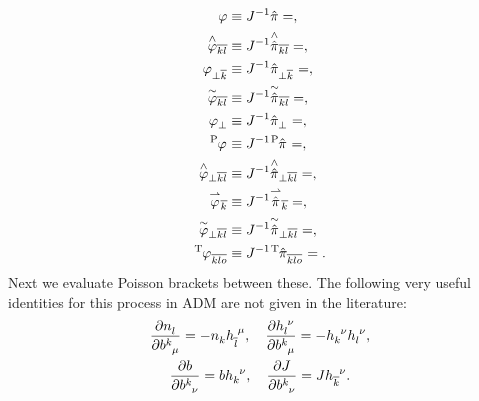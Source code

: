 \documentclass[aps,prd,reprint,preprintnumbers,superscriptaddress,showpacs,floatfix]{revtex4-2}
\begin{document}
\begin{subequations}
\begin{align}
  \pic{B0p}&\equiv J^{-1}\PiP{B0p}=,\\
  \pic{B1p}&\equiv J^{-1}\PiP{B1p}=,\\
  \pic{B1m}&\equiv J^{-1}\PiP{B1m}=,\\
  \pic{B2p}&\equiv J^{-1}\PiP{B2p}=,\\
  \pic{A0p}&\equiv J^{-1}\PiP{A0p}=,\\
  \pic{A0m}&\equiv J^{-1}\PiP{A0m}=,\\
  \pic{A1p}&\equiv J^{-1}\PiP{A1p}=,\\
  \pic{A1m}&\equiv J^{-1}\PiP{A1m}=,\\
  \pic{A2p}&\equiv J^{-1}\PiP{A2p}=,\\
  \pic{A2m}&\equiv J^{-1}\PiP{A2m}=.
\end{align}
\end{subequations}
Next we evaluate Poisson brackets between these. The following very useful identities for this process in ADM are not given in the literature: 
\begin{equation}
  \begin{gathered}
    \frac{\partial\tensor{n}{_l}}{\partial\tensor{b}{^k_\mu}}=-\tensor{n}{_k}\tensor{h}{_{\overline{l}}^\mu}, \quad \frac{\partial\tensor{h}{_l^\nu}}{\partial\tensor{b}{^k_\mu}}=-\tensor{h}{_k^\nu}\tensor{h}{_l^\nu},\\
    \frac{\partial b}{\partial\tensor{b}{^k_\nu}}=b\tensor{h}{_k^\nu}, \quad \frac{\partial J}{\partial\tensor{b}{^k_\nu}}=J\tensor{h}{_{\overline{k}}^\nu}.
  \end{gathered}
  \label{<+label+>}
\end{equation}
\end{document}
